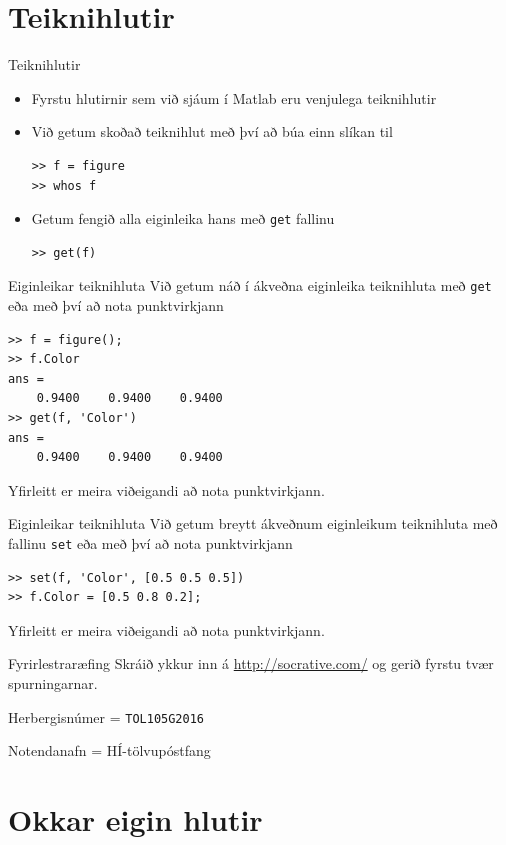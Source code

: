 \documentclass{beamer}
\begin{document}
\section{Teiknihlutir}

\begin{frame}[fragile]{Teiknihlutir}
\begin{itemize}
 \item Fyrstu hlutirnir sem við sjáum í Matlab eru venjulega teiknihlutir
 \item Við getum skoðað teiknihlut með því að búa einn slíkan til
\begin{verbatim}
>> f = figure
>> whos f
\end{verbatim}
 \item Getum fengið alla eiginleika hans með \texttt{get} fallinu
\begin{verbatim}
>> get(f)
\end{verbatim}
\end{itemize}
\end{frame}

\begin{frame}[fragile]{Eiginleikar teiknihluta}
Við getum náð í ákveðna eiginleika teiknihluta með \texttt{get} eða með því að nota punktvirkjann
\begin{verbatim}
>> f = figure();
>> f.Color
ans =
    0.9400    0.9400    0.9400
>> get(f, 'Color')
ans =
    0.9400    0.9400    0.9400
\end{verbatim}
Yfirleitt er meira viðeigandi að nota punktvirkjann.
\end{frame}

\begin{frame}[fragile]{Eiginleikar teiknihluta}
Við getum breytt ákveðnum eiginleikum teiknihluta með fallinu \texttt{set} eða með því að nota punktvirkjann
\begin{verbatim}
>> set(f, 'Color', [0.5 0.5 0.5])
>> f.Color = [0.5 0.8 0.2];
\end{verbatim}
Yfirleitt er meira viðeigandi að nota punktvirkjann.
\end{frame}

\begin{frame}[fragile]{Fyrirlestraræfing}
Skráið ykkur inn á \url{http://socrative.com/} og gerið fyrstu tvær spurningarnar.

Herbergisnúmer = \texttt{TOL105G2016}

Notendanafn = HÍ-tölvupóstfang
\end{frame}


\section{Okkar eigin hlutir}
\end{document}
